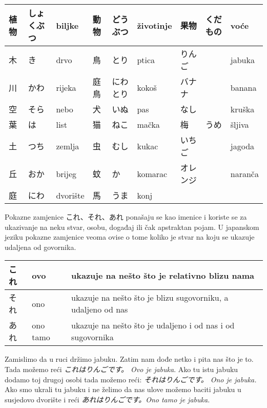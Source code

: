 
\author{Tomislav Mamić, Željka Ludošan}


	
	\vspace{10pt}
	\begin{tabular}{|l|l|l||l||l||l||l||l||l|}
		\hline
		植物&しょくぶつ&biljke&動物&どうぶつ&životinje&果物&くだもの&voće\\\hline
		木&き&drvo&鳥&とり&ptica&りんご&&jabuka\\\hline
		川&かわ&rijeka&庭鳥&にわとり&kokoš&バナナ&&banana\\\hline
		空&そら&nebo&犬&いぬ&pas&なし&&kruška\\\hline
		葉&は&list&猫&ねこ&mačka&梅&うめ&šljiva\\\hline
		土&つち&zemlja&虫&むし&kukac&いちご&&jagoda\\\hline
		丘&おか&brijeg&蚊&か&komarac&オレンジ&&naranča\\\hline
		庭&にわ&dvorište&馬&うま&konj&&&\\\hline
	\end{tabular}
	\vspace{10pt}

	

	Pokazne zamjenice これ、それ、あれ ponašaju se kao imenice i koriste se za ukazivanje na neku stvar, osobu, događaj ili čak apstraktan pojam. U japanskom jeziku pokazne zamjenice veoma ovise o tome koliko je stvar na koju se ukazuje udaljena od govornika.
	
	\vspace{10pt}
	\begin{tabular}{|l|l|l|}
		\hline
		これ&ovo&ukazuje na nešto što je relativno blizu nama\\\hline
		それ&ono&ukazuje na nešto što je blizu sugovorniku, a udaljeno od nas\\\hline
		あれ&ono tamo&ukazuje na nešto što je udaljeno i od nas i od sugovornika\\\hline
	\end{tabular}
	\vspace{10pt}
	
	Zamislimo da u ruci držimo jabuku. Zatim nam dođe netko i pita nas što je to.
	Tada možemo reći \textit{これはりんごです。 Ovo je jabuka}. Ako tu istu jabuku dodamo toj drugoj osobi tada možemo reći:	\textit{それはりんごです。 Ono je jabuka.} Ako smo ukrali tu jabuku i ne želimo da nas ulove možemo baciti jabuku u susjedovo dvorište i reći \textit{あれはりんごです。Ono tamo je jabuka.}
	
